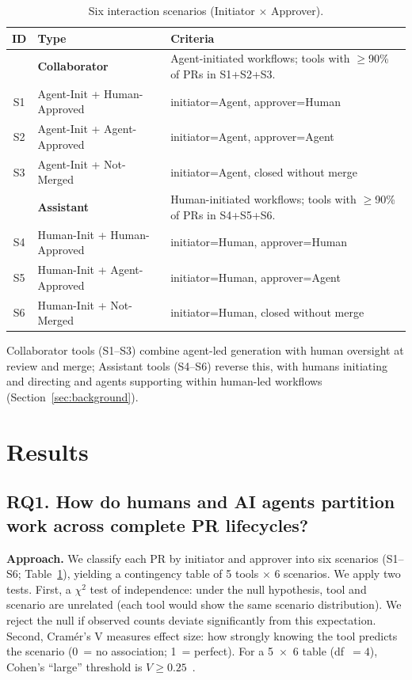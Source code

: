 \documentclass[sigconf]{acmart}
\begin{document}
\begin{table}[t]
\caption{Six interaction scenarios (Initiator $\times$ Approver).}
\label{tab:taxonomy}
\centering
\small
\begin{tabularx}{\linewidth}{@{}cl>{\raggedright\arraybackslash}X@{}}
\toprule
\textbf{ID} & \textbf{Type} & \textbf{Criteria} \\
\midrule
& \textbf{Collaborator} & Agent-initiated workflows; tools with $\geq$90\% of PRs in S1+S2+S3. \\
S1 & Agent-Init + Human-Approved & initiator=Agent, approver=Human \\
S2 & Agent-Init + Agent-Approved & initiator=Agent, approver=Agent \\
S3 & Agent-Init + Not-Merged & initiator=Agent, closed without merge \\
\midrule
& \textbf{Assistant} & Human-initiated workflows; tools with $\geq$90\% of PRs in S4+S5+S6. \\
S4 & Human-Init + Human-Approved & initiator=Human, approver=Human \\
S5 & Human-Init + Agent-Approved & initiator=Human, approver=Agent \\
S6 & Human-Init + Not-Merged & initiator=Human, closed without merge \\
\bottomrule
\end{tabularx}
\end{table}

Collaborator tools (S1--S3) combine agent-led generation with
human oversight at review and merge; Assistant tools (S4--S6)
reverse this, with humans initiating and directing and agents
supporting within human-led workflows
(Section~\ref{sec:background}).

\section{Results}
\label{sec:results}

\subsection{RQ1. How do humans and AI agents partition work across complete PR lifecycles?}

\textbf{Approach.} We classify each PR by initiator and approver
into six scenarios (S1--S6; Table~\ref{tab:taxonomy}), yielding a
contingency table of 5 tools $\times$ 6 scenarios.
We apply two tests.
First, a $\chi^2$ test of independence: under the null
hypothesis, tool and scenario are unrelated (each tool would
show the same scenario distribution).
We reject the null if observed counts deviate significantly
from this expectation.
Second, Cram\'er's V measures effect size: how strongly
knowing the tool predicts the scenario (0~= no association;
1~= perfect).
For a 5~$\times$~6 table (df~$= 4$), Cohen's ``large'' threshold
is $V \geq 0.25$~\cite{cohen1988power}.
\end{document}
